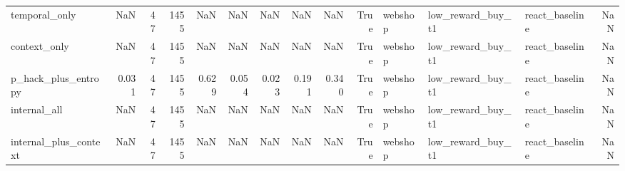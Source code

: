 \begin{tabular}{lrrrrrrrrrlllr}
temporal_only & NaN & 47 & 1455 & NaN & NaN & NaN & NaN & NaN & True & webshop & low_reward_buy_t1 & react_baseline & NaN \\
context_only & NaN & 47 & 1455 & NaN & NaN & NaN & NaN & NaN & True & webshop & low_reward_buy_t1 & react_baseline & NaN \\
p_hack_plus_entropy & 0.031 & 47 & 1455 & 0.629 & 0.054 & 0.023 & 0.191 & 0.340 & True & webshop & low_reward_buy_t1 & react_baseline & NaN \\
internal_all & NaN & 47 & 1455 & NaN & NaN & NaN & NaN & NaN & True & webshop & low_reward_buy_t1 & react_baseline & NaN \\
internal_plus_context & NaN & 47 & 1455 & NaN & NaN & NaN & NaN & NaN & True & webshop & low_reward_buy_t1 & react_baseline & NaN \\
\bottomrule
\end{tabular}
